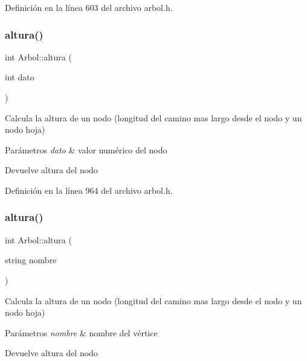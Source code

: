 Definición en la línea 603 del archivo arbol.\+h.

\mbox{\label{classArbol_a98151655f0dab81b40d34f87fbbd90cd}} 
\subsubsection{\texorpdfstring{altura()}{altura()}\hspace{0.1cm}{\footnotesize\ttfamily [1/3]}}
{\footnotesize\ttfamily int Arbol\+::altura (\begin{DoxyParamCaption}\item[{int}]{dato }\end{DoxyParamCaption})}



Calcula la altura de un nodo (longitud del camino mas largo desde el nodo y un nodo hoja) 


\begin{DoxyParams}{Parámetros}
{\em dato} & valor numérico del nodo \\
\hline
\end{DoxyParams}
\begin{DoxyReturn}{Devuelve}
altura del nodo 
\end{DoxyReturn}


Definición en la línea 964 del archivo arbol.\+h.

\mbox{\label{classArbol_a7a79cb43ca30b5120f1a8ebe3afbe22c}} 
\subsubsection{\texorpdfstring{altura()}{altura()}\hspace{0.1cm}{\footnotesize\ttfamily [2/3]}}
{\footnotesize\ttfamily int Arbol\+::altura (\begin{DoxyParamCaption}\item[{string}]{nombre }\end{DoxyParamCaption})}



Calcula la altura de un nodo (longitud del camino mas largo desde el nodo y un nodo hoja) 


\begin{DoxyParams}{Parámetros}
{\em nombre} & nombre del vértice \\
\hline
\end{DoxyParams}
\begin{DoxyReturn}{Devuelve}
altura del nodo 
\end{DoxyReturn}


